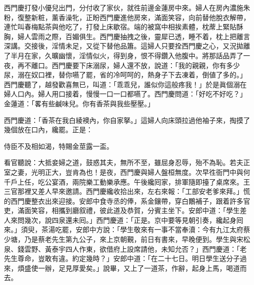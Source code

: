 西門慶打發小優兒出門，分付收了家伙，就徃前邊金蓮房中來。婦人在房內濃施朱粉，復整新粧，薰香澡牝，正盼西門慶進他房來，滿面笑容，向前替他脫衣解帶，連忙叫春梅點茶與他吃了，打發上床歇宿。端的被窩中相挨素體，枕蓆上緊貼酥胸，婦人雲雨之際，百媚俱生。西門慶抽拽之後，靈犀已透，睡不着，枕上把離言深講。交接後，淫情未足，又從下替他品簫。這婦人只要拴西門慶之心，又況拋離了半月在家，久曠幽懷，淫情似火，得到身，恨不得鑽入他腹中。將那話品弄了一夜，再不離口。西門慶要下床溺尿，婦人還不放，說道：「我的親親，你有多少尿，溺在奴口裡，替你嚥了罷，省的冷呵呵的，熱身子下去凍着，倒値了多的。」{}西門慶聽了，越發歡喜無已，叫道：「乖乖兒，誰似你這般疼我！」於是眞個溺在婦人口內。婦人用口接着，慢慢一口一口都嚥了。西門慶問道：「好吃不好吃？」{}金蓮道：「畧有些鹹味兒。{}你有香茶與我些壓壓。」

西門慶道：「香茶在我白綾襖內，你自家拏。」這婦人向床頭拉過他袖子來，掏摸了幾個放在口內，纔罷。正是：

\begin{myquote}
侍臣不及相如渴，特賜金莖露一盃。
\end{myquote}

看官聽說：大抵妾婦之道，鼓惑其夫，無所不至，雖屈身忍辱，殆不為恥。若夫正室之妻，光明正大，豈肯為也！是夜，西門慶與婦人盤桓無度。次早徃衙門中與何千戶上任，吃公宴酒，兩院樂工動樂承應。午後纔囘家，排軍隨即擡了桌席來。王三官那裡又差人早來邀請。西門慶纔收拾出來，左右來報：「工部安老爹來拜。」慌的西門慶整衣出來迎接。安郎中食寺丞的俸，系金鑲帶，穿白鷳補子，跟着許多官吏，滿面笑容，相攜到廳叙禮，彼此道及恭賀，分賓主坐下。安郎中道：「學生差人來問幾次，說四泉還未囘。」西門慶道：「正是。京中要等見朝引奏，纔起身囘來。」須臾，茶湯吃罷，安郎中方說：「學生敬來有一事不當奉瀆：今有九江太府蔡少塘，乃是蔡老先生第九公子，來上京朝覲，前日有書來，早晚便到。學生與宋松泉、錢雲野、黃泰宇四人作東，欲借府上設席請他，未知允否？」西門慶道：「老先生尊命，豈敢有違。約定幾時？」安郎中道：「在二十七日。明日學生送分子過來，煩盛使一辦，足見厚愛矣。」說畢，又上了一道茶，作辭，起身上馬，喝道而去。

